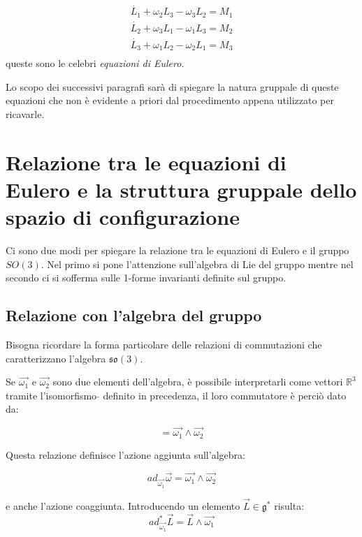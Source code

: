 \documentclass[11pt]{report}
\theoremstyle{plain}
\theoremstyle{definition}
\theoremstyle{remark}
\begin{document}
 \begin{equation}\label{eq:eulero}
\begin {array}{c}
 \dot{L_{1}} + \omega_{2}L_{3} - \omega_{3}L_{2} = M_{1} \\
 \dot{L_{2}} + \omega_{3}L_{1} - \omega_{1}L_{3} = M_{2} \\
 \dot{L_{3}} + \omega_{1}L_{2} - \omega_{2}L_{1} = M_{3} \\
 \end{array}
 \end{equation}
queste sono le celebri \emph{equazioni di Eulero}.

Lo scopo dei successivi paragrafi sarà di spiegare la natura gruppale di queste equazioni che non è evidente a priori dal procedimento appena utilizzato per ricavarle.

\section{Relazione tra le equazioni di Eulero e la struttura gruppale dello spazio di configurazione}
Ci sono due modi per spiegare la relazione tra le equazioni di Eulero e il gruppo $SO(3)$.
Nel primo si pone l'attenzione sull'algebra di Lie del gruppo mentre nel secondo ci si sofferma sulle 1-forme invarianti definite sul gruppo.

\subsection{Relazione con l'algebra del gruppo}
Bisogna ricordare la forma particolare delle relazioni di commutazioni che caratterizzano l'algebra $\mathfrak{so(3)}$.

Se $\vec{\omega_{1}}$ e $\vec{\omega_{2}}$ sono due elementi dell'algebra, è possibile interpretarli come vettori $\mathbb{R}^{3}$ tramite l'isomorfismo $\widehat{}$ definito in precedenza, il loro commutatore è perciò dato da:

\begin{displaymath}
[\vec{\omega_{1}} , \vec{\omega_{2}} ] = \vec{\omega_{1}} \wedge \vec{\omega_{2}}
\end{displaymath}

Questa relazione definisce l'azione aggiunta sull'algebra:

\begin{displaymath}
ad_{\vec{\omega_{1}}} \vec{\omega} = \vec{\omega_{1}} \wedge \vec{\omega_{2}}
\end{displaymath}

e anche l'azione coaggiunta. Introducendo un elemento $\vec{L} \in \mathfrak{g}^{\ast}$ risulta:
\begin{displaymath}
ad_{\vec{\omega_{1}}}^{\ast} \vec{L} = \vec{L} \wedge \vec{\omega_{1}}
\end{displaymath}
\end{document}
